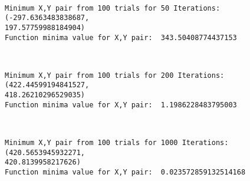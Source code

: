 \documentclass[11pt]{article}
\begin{document}
    \begin{center}
    \end{center}
    { \hspace*{\fill} \\}
    
    \begin{Verbatim}[commandchars=\\\{\}]
Minimum X,Y pair from 100 trials for 50 Iterations: (-297.6363483838687,
197.57759988184904)
Function minima value for X,Y pair:  343.50408774437153
    \end{Verbatim}

    \begin{center}
    \end{center}
    { \hspace*{\fill} \\}
    
    \begin{Verbatim}[commandchars=\\\{\}]
Minimum X,Y pair from 100 trials for 200 Iterations: (422.44599194841527,
418.26210296529035)
Function minima value for X,Y pair:  1.1986228483795003
    \end{Verbatim}

    \begin{center}
    \end{center}
    { \hspace*{\fill} \\}
    
    \begin{Verbatim}[commandchars=\\\{\}]
Minimum X,Y pair from 100 trials for 1000 Iterations: (420.5653945932271,
420.8139958217626)
Function minima value for X,Y pair:  0.023572859132514168
    \end{Verbatim}

    \begin{center}
    \end{center}
    { \hspace*{\fill} \\}
    
\end{document}
